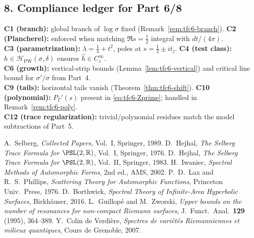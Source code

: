 \subsection*{8. Compliance ledger for Part 6/8}\relax\hspace{0pt}
\label{subsec:tfc6-compliance} %

\noindent
\textbf{C1 (branch):} global branch of $\log\sigma$ fixed (Remark~\ref{rem:tfc6-branch}). \quad
\textbf{C2 (Plancherel):} enforced when matching $\Re s=\tfrac12$ integral with $dt/(4\pi)$. \\
\textbf{C3 (parametrization):} $\lambda=\tfrac14+t^2$, poles at $s=\tfrac12\pm it_j$. \quad
\textbf{C4 (test class):} $h\in\mathcal{H}_{\mathrm{PW}}(\sigma,\delta)$ ensures $\widehat{h}\in C_c^\infty$. \\
\textbf{C6 (growth):} vertical-strip bounds (Lemma~\ref{lem:tfc6-vertical}) and critical line bound for $\sigma'/\sigma$ from Part~4. \\
\textbf{C9 (tails):} horizontal tails vanish (Theorem~\ref{thm:tfc6-shift}). \quad
\textbf{C10 (polynomial):} $P_\Gamma'(s)$ present in \eqref{eq:tfc6-Zprime}; handled in Remark~\ref{rem:tfc6-poly}. \\
\textbf{C12 (trace regularization):} trivial/polynomial residues match the model subtractions of Part~5. \relax\hspace{0pt}

\begin{thebibliography}{99} %
 A.~Selberg, \emph{Collected Papers}, Vol.~I, Springer, 1989. %
 D.~Hejhal, \emph{The Selberg Trace Formula for $\PSL(2,\mathbb{R})$}, Vol.~I, Springer, 1976. %
 D.~Hejhal, \emph{The Selberg Trace Formula for $\PSL(2,\mathbb{R})$}, Vol.~II, Springer, 1983. %
 H.~Iwaniec, \emph{Spectral Methods of Automorphic Forms}, 2nd ed., AMS, 2002. %
 P.~D.~Lax and R.~S.~Phillips, \emph{Scattering Theory for Automorphic Functions}, Princeton Univ.\ Press, 1976. %
 D.~Borthwick, \emph{Spectral Theory of Infinite-Area Hyperbolic Surfaces}, Birkhäuser, 2016. %
 L.~Guillopé and M.~Zworski, \emph{Upper bounds on the number of resonances for non-compact Riemann surfaces}, J.\ Funct.\ Anal.\ \textbf{129} (1995), 364–389. %
 Y.~Colin de Verdière, \emph{Spectres de variétés Riemanniennes et milieux quantiques}, Cours de Grenoble, 2007. %
\end{thebibliography}

